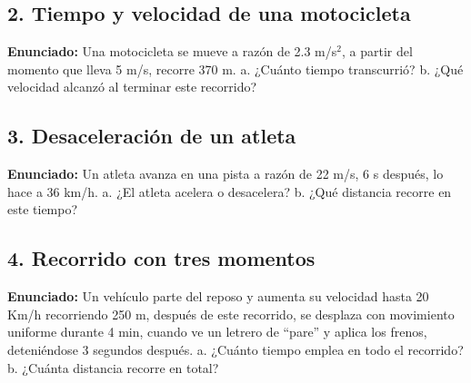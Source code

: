 \documentclass[12pt, letterpaper]{article}
\begin{document}
\subsection*{2. Tiempo y velocidad de una motocicleta}
\noindent \textbf{Enunciado:} Una motocicleta se mueve a razón de 2.3 m/s$^2$, a partir del momento que lleva 5 m/s, recorre 370 m. a. ¿Cuánto tiempo transcurrió? b. ¿Qué velocidad alcanzó al terminar este recorrido?


\subsection*{3. Desaceleración de un atleta}
\noindent \textbf{Enunciado:} Un atleta avanza en una pista a razón de 22 m/s, 6 s después, lo hace a 36 km/h. a. ¿El atleta acelera o desacelera? b. ¿Qué distancia recorre en este tiempo?


\subsection*{4. Recorrido con tres momentos}
\noindent \textbf{Enunciado:} Un vehículo parte del reposo y aumenta su velocidad hasta 20 Km/h recorriendo 250 m, después de este recorrido, se desplaza con movimiento uniforme durante 4 min, cuando ve un letrero de “pare” y aplica los frenos, deteniéndose 3 segundos después. a. ¿Cuánto tiempo emplea en todo el recorrido? b. ¿Cuánta distancia recorre en total?
\end{document}
